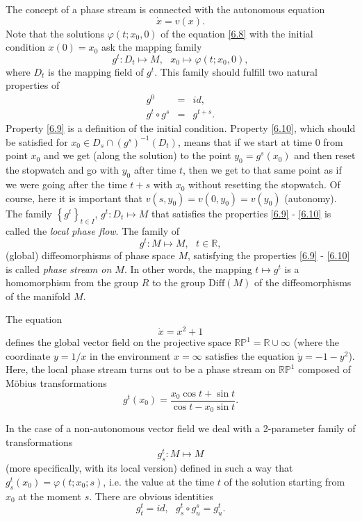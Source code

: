 The concept of a phase stream is connected with the autonomous equation
\begin{equation}
\label{6.8}
\dot{x}=v(x).
\end{equation}
Note that the solutions $\varphi (t;x_{0},0)$ of the equation \eqref{6.8} with the initial condition $x(0)=x_{0}$ ask the mapping family
$$
g^{t}:D_{t}\longmapsto M,\text{ \ }x_{0}\longmapsto \varphi (t;x_{0},0),
$$
where $D_{t}$ is the mapping field of $g^t$. This family should fulfill two natural properties of
\begin{eqnarray}
g^{0} &=&id,  \label{6.9} \\
g^{t}\circ g^{s} &=&g^{t+s}.  \label{6.10}
\end{eqnarray}
Property \eqref{6.9} is a definition of the initial condition. Property \eqref{6.10}, which should be satisfied for $x_{0}\in D_{s}\cap
\left( g^{s}\right) ^{-1}(D_{t})$, means that if we start at time $0$ from point $x_0$ and we get (along the solution) to the point $y_{0}=g^{s}(x_{0})$ and then reset the stopwatch and go with $y_{0}$ after time $t$, then we get to that same point as if we were going after the time $t+s$ with $x_{0}$ without resetting the stopwatch. Of course, here it is important that $v(s,y_{0})=v(0,y_{0})=v(y_{0})$ (autonomy).
The family $\left\{ g^{t}\right\} _{t\in I}$, $g^{t}:D_{t}\longmapsto M$ that satisfies the properties \eqref{6.9} - \eqref{6.10} is called the \emph{local phase flow}. The family of
$$
g^{t}:M\longmapsto M,\text{ \ }t\in \mathbb{R},
$$
(global) diffeomorphisms of phase space $M$, satisfying the properties \eqref{6.9} - \eqref{6.10} is called \emph{phase stream on $M$}. In other words, the mapping $t\longmapsto g^{t}$ is a homomorphism from the group $R$ to the group $\textrm{Diff}(M)$ of the diffeomorphisms of the manifold $M$.

\begin{example}
	The equation
	$$
	\dot{x}=x^{2}+1
	$$
	defines the global vector field on the projective space $\mathbb{RP}^{1} = \mathbb{R}\cup \infty $ (where the coordinate $y=1/x$ in the environment $x=\infty $ satisfies the equation $\dot{y}=-1-y^{2}$). Here, the local phase stream turns out to be a phase stream on $\mathbb{RP}^{1}$ composed of Möbius transformations
	$$
	g^{t}(x_{0})=\frac{x_{0}\cos t+\sin t}{\cos t-x_{0}\sin t}.
	$$
\end{example}

\begin{remark}
	In the case of a non-autonomous vector field we deal with a 2-parameter family of transformations
	$$
	g_{s}^{t}:M\longmapsto M
	$$
	(more specifically, with its local version) defined in such a way that $g_{s}^{t}(x_{0})=\varphi (t;x_{0};s)$, i.e. the value at the time $t$ of the solution starting from $x_0$ at the moment $s$. There are obvious identities
	$$
	g_{t}^{t}=id,\text{ \ \ }g_{s}^{t}\circ g_{u}^{s}=g_{u}^{t}.
	$$
\end{remark}


